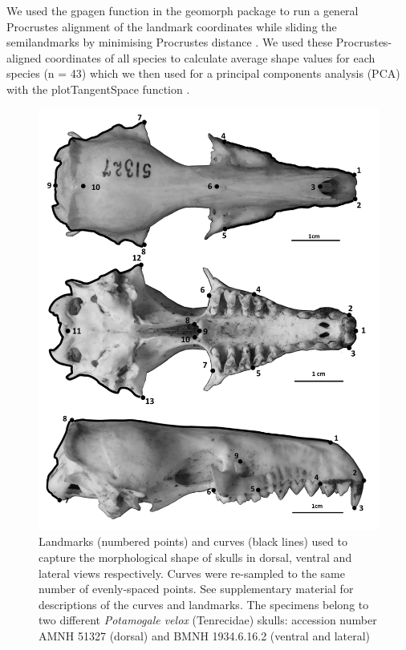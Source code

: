 \documentclass[12pt,a4paper]{article}
\begin{document}
	We used the gpagen function in the geomorph package \citep{Adams2013} to run a general Procrustes alignment \citep{Rohlf1993} of the landmark coordinates while sliding the semilandmarks by minimising Procrustes distance \citep{Bookstein1997}. We used these Procrustes-aligned coordinates of all species to calculate average shape values for each species (n = 43) which we then used for a principal components analysis (PCA) with the plotTangentSpace function \citep{Adams2013}. 
	


	\begin{figure}
	\centering
	\includegraphics[width=1\linewidth]{figures/skdors+skvent+sklat_BW.png}
	
	\caption[Diagram of the landmarks and curves for the skulls in dorsal ventral and lateral views]
		{Landmarks (numbered points) and curves (black lines) used to capture the morphological shape of skulls in dorsal, ventral and lateral views respectively. Curves were re-sampled to the same number of evenly-spaced points. See supplementary material for descriptions of the curves and landmarks. The specimens belong to two different \textit{Potamogale velox} (Tenrecidae) skulls: accession number AMNH 51327 (dorsal) and BMNH 1934.6.16.2 (ventral and lateral)}
	
	\label{fig:skulls_landmarks}
	\end{figure}
\end{document}
